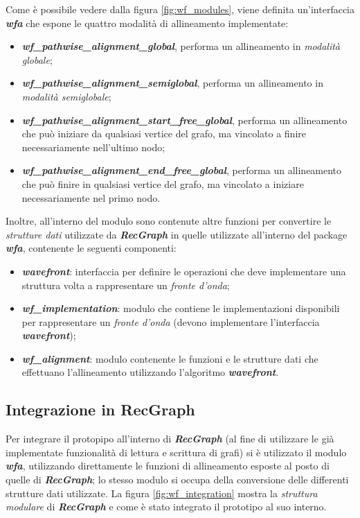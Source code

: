     Come è possibile vedere dalla figura \ref{fig:wf_modules}, viene definita un'interfaccia \textbf{\textit{wfa}} che espone le quattro modalità di allineamento implementate:
    \begin{itemize}
        \item \textbf{\textit{wf\_pathwise\_alignment\_global}}, performa un allineamento in \emph{modalità globale};
        \item \textbf{\textit{wf\_pathwise\_alignment\_semiglobal}}, performa un allineamento in \emph{modalità semiglobale};
        \item \textbf{\textit{wf\_pathwise\_alignment\_start\_free\_global}}, performa un allineamento che può iniziare da qualsiasi vertice del grafo, ma vincolato a finire necessariamente nell'ultimo nodo;
        \item \textbf{\textit{wf\_pathwise\_alignment\_end\_free\_global}}, performa un allineamento che può finire in qualsiasi vertice del grafo, ma vincolato a iniziare necessariamente nel primo nodo.
    \end{itemize}
    Inoltre, all'interno del modulo sono contenute altre funzioni per convertire le \emph{strutture dati} utilizzate da \textbf{\textit{RecGraph}} in quelle utilizzate all'interno del package \textbf{\textit{wfa}}, contenente le seguenti componenti:
    \begin{itemize}
        \item \textbf{\textit{wavefront}}: interfaccia per definire le operazioni che deve implementare una struttura volta a rappresentare un \emph{fronte d'onda};
        \item \textbf{\textit{wf\_implementation}}: modulo che contiene le implementazioni disponibili per rappresentare un \emph{fronte d'onda} (devono implementare l'interfaccia \textbf{\textit{wavefront}});
        \item \textbf{\textit{wf\_alignment}}: modulo contenente le funzioni e le strutture dati che effettuano l'allineamento utilizzando l'algoritmo \textbf{\textit{wavefront}}.
    \end{itemize}
\subsection{Integrazione in RecGraph}
    Per integrare il protopipo all'interno di \textbf{\textit{RecGraph}} (al fine di utilizzare le già implementate funzionalità di lettura e scrittura di grafi) si è utilizzato il modulo \textbf{\textit{wfa}}, utilizzando direttamente le funzioni di allineamento esposte al posto di quelle di \textbf{\textit{RecGraph}}; lo stesso modulo si occupa della conversione delle differenti strutture dati utilizzate. La figura \ref{fig:wf_integration} mostra la \emph{struttura modulare} di \textbf{\textit{RecGraph}} e come è stato integrato il prototipo al suo interno.
        
